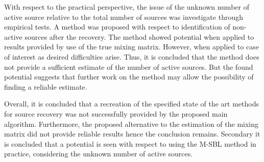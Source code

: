 With respect to the practical perspective, the issue of the unknown number of active source relative to the total number of sources was investigate through empirical tests. A method was proposed with respect to identification of non-active sources after the recovery. The method showed potential when applied to results provided by use of the true mixing matrix. However, when applied to case of interest as desired difficulties arise. Thus, it is concluded that the method does not provide a sufficient estimate of the number of active sources. But the found potential suggests that further work on the method may allow the possibility of finding a reliable estimate. 

Overall, it is concluded that a recreation of the specified state of the art methods for source recovery was not successfully provided by the proposed main algorithm. Furthermore, the proposed alternative to the estimation of the mixing matrix did not provide reliable results hence the conclusion remains. 
Secondary it is concluded that a potential is seen with respect to using the M-SBL method in practice, considering the unknown number of active sources. 
